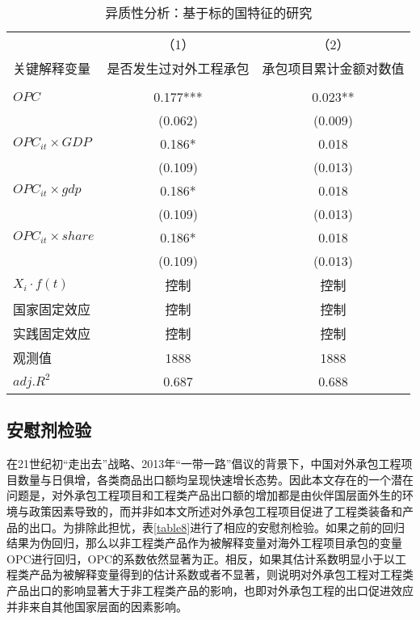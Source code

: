 \documentclass[a4paper,12pt]{article}
\newcommand{\sym}[1]{#1}
\begin{document}
\begin{table} [ht] \footnotesize
	\newcommand{\tabincell}[2]{\begin{tabular}{@{}#1@{}}#2\end{tabular}}  %
	\centering
	\captionsetup{labelformat=default,labelsep=period}
	\caption{异质性分析：基于标的国特征的研究}\label{table7}
	\begin{tabular}{lcc}
		\toprule
		&（1）&（2）\\
		关键解释变量	&是否发生过对外工程承包&承包项目累计金额对数值 \\	
		\cline{1-3} \\
		\vspace{0.05em}  %
		$OPC$ &0.177\sym{***} & 0.023\sym{**} \\
		&(0.062)   	  &(0.009)     \\
		${OPC}_{it}\times GDP$ & 0.186\sym{*}     & 0.018       \\
		&    (0.109)     	  &     (0.013)                 \\	  
		${OPC}_{it}\times gdp$ & 0.186\sym{*}     & 0.018       \\
		&    (0.109)     	  &     (0.013)                 \\	  
		${OPC}_{it}\times share$ & 0.186\sym{*}     & 0.018       \\
		&    (0.109)     	  &     (0.013)                 \\	  
		$X_{i}·f(t)$  & 控制&控制   \\
		国家固定效应  & 控制&控制  \\
		实践固定效应  & 控制&控制   \\
		观测值 &1888&1888\\
		$adj.R^{2}$ &0.687&	0.688\\
		\bottomrule
	\end{tabular}
\end{table}



\subsection{安慰剂检验}

在21世纪初“走出去”战略、2013年“一带一路”倡议的背景下，中国对外承包工程项目数量与日俱增，各类商品出口额均呈现快速增长态势。因此本文存在的一个潜在问题是，对外承包工程项目和工程类产品出口额的增加都是由伙伴国层面外生的环境与政策因素导致的，而并非如本文所述对外承包工程项目促进了工程类装备和产品的出口。为排除此担忧，表\ref{table8}进行了相应的安慰剂检验。如果之前的回归结果为伪回归，那么以非工程类产品作为被解释变量对海外工程项目承包的变量OPC进行回归，OPC的系数依然显著为正。相反，如果其估计系数明显小于以工程类产品为被解释变量得到的估计系数或者不显著，则说明对外承包工程对工程类产品出口的影响显著大于非工程类产品的影响，也即对外承包工程的出口促进效应并非来自其他国家层面的因素影响。
\end{document}
